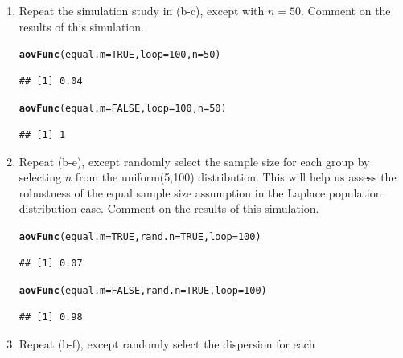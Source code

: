 \documentclass{article}\usepackage[]{graphicx}\usepackage[]{color}
\makeatletter
\newcommand{\hlnum}[1]{\textcolor[rgb]{0.686,0.059,0.569}{#1}}%
\newcommand{\hlstd}[1]{\textcolor[rgb]{0.345,0.345,0.345}{#1}}%
\newcommand{\hlkwc}[1]{\textcolor[rgb]{0.333,0.667,0.333}{#1}}%
\newcommand{\hlkwd}[1]{\textcolor[rgb]{0.737,0.353,0.396}{\textbf{#1}}}%
\newenvironment{kframe}{%
 \def\at@end@of@kframe{}%
 \ifinner\ifhmode%
  \def\at@end@of@kframe{\end{minipage}}%
  \begin{minipage}{\columnwidth}%
 \fi\fi%
 \def\FrameCommand##1{\hskip\@totalleftmargin \hskip-\fboxsep
 \colorbox{shadecolor}{##1}\hskip-\fboxsep
     \hskip-\linewidth \hskip-\@totalleftmargin \hskip\columnwidth}%
 \MakeFramed {\advance\hsize-\width
   \@totalleftmargin\z@ \linewidth\hsize
   \@setminipage}}%
 {\par\unskip\endMakeFramed%
 \at@end@of@kframe}
\newenvironment{knitrout}{}{} %
\makeatother
\begin{document}
\begin{enumerate}
\begin{enumerate}
  \item Repeat the simulation study in (b-c), except with $n=50$.
  Comment on the results of this simulation.
\begin{knitrout}
\color{fgcolor}\begin{kframe}
\begin{alltt}
\hlkwd{aovFunc}\hlstd{(}\hlkwc{equal.m}\hlstd{=}\hlnum{TRUE}\hlstd{,} \hlkwc{loop}\hlstd{=}\hlnum{100}\hlstd{,} \hlkwc{n}\hlstd{=}\hlnum{50}\hlstd{)}
\end{alltt}
\begin{verbatim}
## [1] 0.04
\end{verbatim}
\begin{alltt}
\hlkwd{aovFunc}\hlstd{(}\hlkwc{equal.m}\hlstd{=}\hlnum{FALSE}\hlstd{,} \hlkwc{loop}\hlstd{=}\hlnum{100}\hlstd{,} \hlkwc{n}\hlstd{=}\hlnum{50}\hlstd{)}
\end{alltt}
\begin{verbatim}
## [1] 1
\end{verbatim}
\end{kframe}
\end{knitrout}
\item Repeat (b-e), except randomly select the sample size for each 
group by selecting $n$ from the uniform(5,100) distribution. This 
will help us assess the robustness of the equal sample size assumption
in the Laplace population distribution case. Comment on the results of 
this simulation.
\begin{knitrout}
\color{fgcolor}\begin{kframe}
\begin{alltt}
\hlkwd{aovFunc}\hlstd{(}\hlkwc{equal.m}\hlstd{=}\hlnum{TRUE}\hlstd{,} \hlkwc{rand.n}\hlstd{=}\hlnum{TRUE}\hlstd{,} \hlkwc{loop}\hlstd{=}\hlnum{100}\hlstd{)}
\end{alltt}
\begin{verbatim}
## [1] 0.07
\end{verbatim}
\begin{alltt}
\hlkwd{aovFunc}\hlstd{(}\hlkwc{equal.m}\hlstd{=}\hlnum{FALSE}\hlstd{,} \hlkwc{rand.n}\hlstd{=}\hlnum{TRUE}\hlstd{,} \hlkwc{loop}\hlstd{=}\hlnum{100}\hlstd{)}
\end{alltt}
\begin{verbatim}
## [1] 0.98
\end{verbatim}
\end{kframe}
\end{knitrout}
\item Repeat (b-f), except randomly select the dispersion for each 

\end{enumerate}
\end{enumerate}
\end{document}
